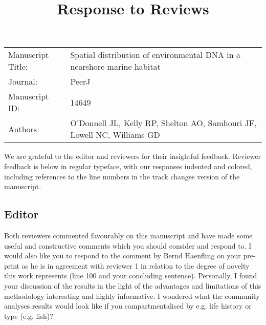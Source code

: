 \documentclass{article}
\begin{document}
\title{Response to Reviews}

\maketitle


\begin{tabular}{ l l }
Manuscript Title: &
Spatial distribution of environmental DNA in a nearshore marine habitat
\\
Journal: &
PeerJ
\\
Manuscript ID: &
14649
\\
Authors: &
O'Donnell JL,
Kelly RP,
Shelton AO,
Samhouri JF,
Lowell NC,
Williams GD
\\
\end{tabular}

\bigskip

We are grateful to the editor and reviewers for their insightful feedback.
Reviewer feedback is below in regular typeface, with our responses indented and colored, including references to the line numbers in the track changes version of the manuscript.

\subsection*{Editor}
Both reviewers commented favourably on this manuscript and have made some useful and constructive comments which you should consider and respond to. I would also like you to respond to the comment by Bernd Haenfling on your pre-print as he is in agreement with reviewer 1 in relation to the degree of novelty this work represents (line 100 and your concluding sentence). Personally, I found your discussion of the results in the light of the advantages and limitations of this methodology interesting and highly informative. I wondered what the community analyses results would look like if you compartmentalised by e.g. life history or type (e.g. fish)?
\end{document}
